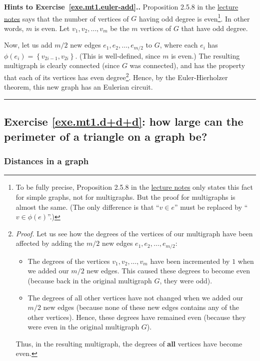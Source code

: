 \documentclass[numbers=enddot,12pt,final,onecolumn,notitlepage]{scrartcl}%
\theoremstyle{definition}
\newenvironment{proof}[1][Proof]{\noindent\textbf{#1.} }{\ \rule{0.5em}{0.5em}}
\newcommand{\set}[1]{\left\{ #1 \right\}}
\newcommand{\tup}[1]{\left( #1 \right)}
\begin{document}
\begin{proof}[Hints to Exercise~\ref{exe.mt1.euler-add}.]
Proposition 2.5.8 in the
\href{http://www.cip.ifi.lmu.de/~grinberg/t/17s/nogra.pdf}{lecture notes}
says that the number of vertices of $G$ having odd degree is
even\footnote{To be fully precise, Proposition 2.5.8 in the
\href{http://www.cip.ifi.lmu.de/~grinberg/t/17s/nogra.pdf}{lecture notes}
only states this fact for simple graphs, not for multigraphs. But the
proof for multigraphs is almost the same. (The only difference is that
``$v \in e$'' must be replaced by ``$v \in \phi\tup{e}$''.)}.
In other words, $m$ is even. Let $v_1, v_2, \ldots, v_m$ be the $m$
vertices of $G$ that have odd degree.

Now, let us add $m/2$ new edges
$e_1, e_2, \ldots, e_{m/2}$ to $G$, where each $e_i$ has
$\phi\tup{e_i} = \set{v_{2i-1}, v_{2i}}$.
(This is well-defined, since $m$ is even.) The resulting multigraph is
clearly connected (since $G$ was connected), and has the property that
each of its vertices has even degree\footnote{\textit{Proof.}
Let us see how the degrees of the vertices of our multigraph have been
affected by adding the $m/2$ new edges $e_1, e_2, \ldots, e_{m/2}$:
\begin{itemize}
\item The degrees of the vertices $v_1, v_2, \ldots, v_m$ have been
      incremented by $1$ when we added our $m/2$ new edges. This
      caused these degrees to become even (because back in the
      original multigraph $G$, they were odd).
\item The degrees of all other vertices have not changed when we added
      our $m/2$ new edges (because none of these new edges contains
      any of the other vertices). Hence, these degrees have remained
      even (because they were even in the original multigraph $G$).
\end{itemize}
Thus, in the resulting multigraph, the degrees of \textbf{all}
vertices have become even.}.
Hence, by the Euler-Hierholzer theorem, this new graph has an Eulerian
circuit.
\end{proof}

\subsection{Exercise \ref{exe.mt1.d+d+d}: how large can the perimeter
of a triangle on a graph be?}

\subsubsection{Distances in a graph}
\end{document}
